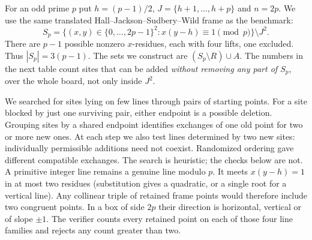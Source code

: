 \documentclass[11pt]{article}
\begin{document}
\newpage
{}
For an odd prime $p$ put $h=(p-1)/2$, $J=\{h+1,\ldots,h+p\}$ and $n=2p$. We use the same translated Hall--Jackson--Sudbery--Wild frame as the benchmark:
\[
 S_p=\{(x,y)\in\{0,\ldots,2p-1\}^2:x(y-h)\equiv1\pmod p\}\setminus J^2.
\]
There are $p-1$ possible nonzero $x$-residues, each with four lifts, one excluded. Thus $|S_p|=3(p-1)$. The sets we construct are $(S_p\setminus R)\cup A$. The numbers in the next table count sites that can be added \emph{without removing any part of $S_p$}, over the whole board, not only inside $J^2$.
\begin{center}\end{center}

We searched for sites lying on few lines through pairs of starting points. For a site blocked by just one surviving pair, either endpoint is a possible deletion. Grouping sites by a shared endpoint identifies exchanges of one old point for two or more new ones. At each step we also test lines determined by two new sites: individually permissible additions need not coexist. Randomized ordering gave different compatible exchanges. The search is heuristic; the checks below are not.
A primitive integer line remains a genuine line modulo $p$. It meets $x(y-h)=1$ in at most two residues (substitution gives a quadratic, or a single root for a vertical line). Any collinear triple of retained frame points would therefore include two congruent points. In a box of side $2p$ their direction is horizontal, vertical or of slope $\pm1$. The verifier counts every retained point on each of those four line families and rejects any count greater than two.
\end{document}

